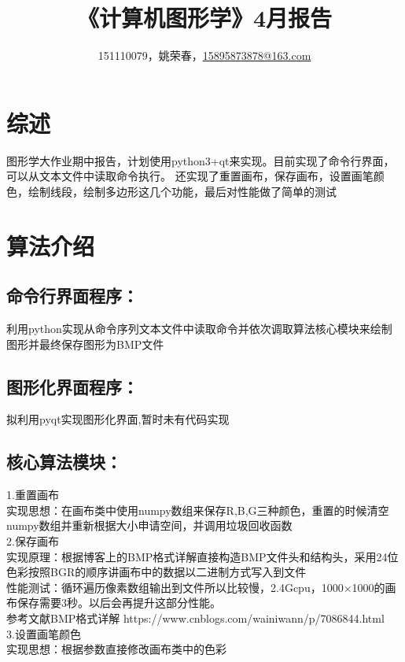 \documentclass[a4paper,UTF8]{article}
\theoremstyle{definition}
\renewcommand\refname{参考文献}
\begin{document}
\title{\textbf{《计算机图形学》4月报告}}
\author{151110079，姚荣春，\href{mailto:15895873878@163.com}{15895873878@163.com}}
\maketitle

\section{综述}
图形学大作业期中报告，计划使用python3+qt来实现。目前实现了命令行界面，可以从文本文件中读取命令执行。
还实现了重置画布，保存画布，设置画笔颜色，绘制线段，绘制多边形这几个功能，最后对性能做了简单的测试

\section{算法介绍}
\subsection{命令行界面程序：}
利用python实现从命令序列文本文件中读取命令并依次调取算法核心模块来绘制图形并最终保存图形为BMP文件
\subsection{图形化界面程序：}
拟利用pyqt实现图形化界面,暂时未有代码实现
\subsection{核心算法模块：}
\noindent{}1.重置画布\\
\indent{}实现思想：在画布类中使用numpy数组来保存R,B,G三种颜色，重置的时候清空numpy数组并重新根据大小申请空间，并调用垃圾回收函数\\

\noindent{}2.保存画布\\
\indent{}实现原理：根据博客上的BMP格式详解直接构造BMP文件头和结构头，采用24位色彩按照BGR的顺序讲画布中的数据以二进制方式写入到文件\\
\indent{}性能测试：循环遍历像素数组输出到文件所以比较慢，2.4Gcpu，1000×1000的画布保存需要3秒。以后会再提升这部分性能。\\
\indent{}\refname{BMP格式详解 https://www.cnblogs.com/wainiwann/p/7086844.html}\\

\noindent{}3.设置画笔颜色\\
\indent{}实现思想：根据参数直接修改画布类中的色彩\\
\end{document}
